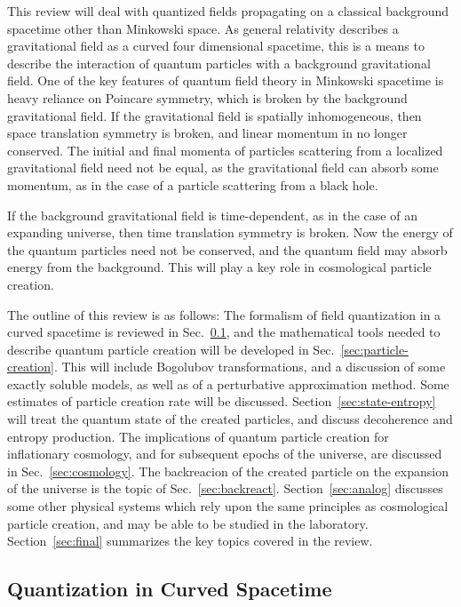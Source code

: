 \documentclass[eqsecnum,floats,aps,prd,floatfix,titlepage,tightenlines]{revtex4}
\begin{document}
This review will deal with quantized fields propagating on a classical background spacetime other than Minkowski
space. As general relativity describes a gravitational field as a curved four dimensional spacetime, this is a means
to describe the interaction of quantum particles with a background  gravitational field. One of the key features of
quantum field theory in Minkowski spacetime is heavy reliance on Poincare symmetry, which is broken by the
background  gravitational field. If the gravitational field is spatially inhomogeneous, then space translation symmetry
is broken, and linear momentum in no longer conserved. The initial and final momenta of particles scattering from
a localized gravitational field need not be equal, as the gravitational field can absorb some momentum, as in the case 
of a particle scattering from a black hole.  

If the background gravitational field is time-dependent, as in the case of an expanding universe, then time translation
symmetry is broken. Now the energy of the quantum particles need not be conserved, and the quantum field may
absorb energy from the background. This will play a key role in cosmological particle creation.

The outline of this review is as follows: The formalism of field quantization in a curved spacetime is reviewed in
Sec.~\ref{sec:quantization}, and the mathematical tools needed to describe quantum particle creation will be developed
in Sec.~\ref{sec:particle-creation}. This will include Bogolubov transformations, and a discussion of some exactly
soluble models, as well as of a perturbative approximation method. Some estimates of particle creation rate will be
discussed. Section~\ref{sec:state-entropy} will treat the quantum state of the created particles, and discuss decoherence
and entropy production. The implications of quantum particle creation for inflationary cosmology, and for subsequent epochs
of the universe, are discussed in Sec.~\ref{sec:cosmology}. The backreacion of the created particle on the expansion of
the universe is the topic of Sec.~\ref{sec:backreact}. Section~\ref{sec:analog} discusses some other physical systems
which rely upon the same principles as cosmological particle creation, and may be able to be studied in the laboratory.
Section~\ref{sec:final} summarizes the key topics covered in the review.




\subsection{Quantization in Curved Spacetime}
\label{sec:quantization}
\end{document}
